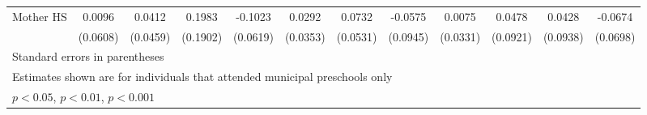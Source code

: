 \begin{table}[htbp]
\begin{tabular}{l*{11}{c}}
\addlinespace
Mother HS   &      0.0096         &      0.0412         &      0.1983         &     -0.1023         &      0.0292         &      0.0732         &     -0.0575         &      0.0075         &      0.0478         &      0.0428         &     -0.0674         \\
            &    (0.0608)         &    (0.0459)         &    (0.1902)         &    (0.0619)         &    (0.0353)         &    (0.0531)         &    (0.0945)         &    (0.0331)         &    (0.0921)         &    (0.0938)         &    (0.0698)         \\
\bottomrule
\multicolumn{12}{l}{\footnotesize Standard errors in parentheses}\\
\multicolumn{12}{l}{\footnotesize Estimates shown are for individuals that attended municipal preschools only}\\
\multicolumn{12}{l}{\footnotesize \sym{*} \(p<0.05\), \sym{**} \(p<0.01\), \sym{***} \(p<0.001\)}\\
\end{tabular}
\end{table}
